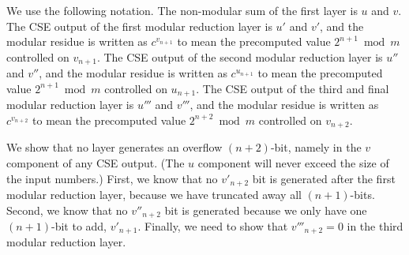 \begin{center}
\begin{figure}[h!tb]
\begin{displaymath}
\end{displaymath}
\label{fig:csa-proof}
\end{figure}
\end{center}

We use the following notation.
The non-modular sum of the first layer is $u$ and $v$.
The CSE output of the first modular reduction layer
is $u'$ and $v'$, and the modular residue is
written as $c^{v_{n+1}}$ to mean the precomputed value $2^{n+1} \bmod m$
controlled on $v_{n+1}$.
The CSE output of the second modular reduction layer
is $u''$ and $v''$, and the modular residue is written as
$c^{u_{n+1}}$ to mean the precomputed value $2^{n+1} \bmod m$
controlled on $u_{n+1}$.
The CSE output of the third and final modular reduction layer
is $u'''$ and $v'''$, and the modular residue is written as
$c^{v_{n+2}}$ to mean the precomputed value $2^{n+2} \bmod m$
controlled on $v_{n+2}$.

We show that no layer generates an overflow $(n+2)$-bit, namely in the
$v$ component of any CSE output. (The $u$ component will never exceed the
size of the input numbers.) First, we know that no $v'_{n+2}$ bit
is generated after the first modular reduction layer, because we have
truncated away all $(n+1)$-bits. Second, we know that no $v''_{n+2}$ bit is
generated because we only have one $(n+1)$-bit to add, $v'_{n+1}$.
Finally, we need to show that $v'''_{n+2} = 0$ in the third modular reduction
layer. 


